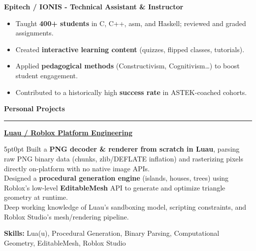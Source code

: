 \documentclass[9pt]{extarticle}
\begin{document}
{\bfseries Epitech / IONIS - Technical Assistant \& Instructor}
\begin{itemize}[noitemsep, topsep=0pt]
	\item Taught {\bfseries 400+ students} in C, C++, asm, and Haskell; reviewed and graded assignments.
	\item Created {\bfseries interactive learning content} (quizzes, flipped classes, tutorials).
	\item Applied {\bfseries pedagogical methods} (Constructivism, Cognitivism…) to boost student engagement.
	\item Contributed to a historically high {\bfseries success rate} in ASTEK-coached cohorts.
\end{itemize}

\par\vspace{1pt}


{\large\bfseries Personal Projects}
\par\vspace{-8pt}
\rule{\linewidth}{0.4pt}
\par\vspace{1pt}

\underline{{\bfseries Luau / Roblox Platform Engineering}}
\par
\begin{adjustwidth}{5pt}{0pt}
	Built a {\bfseries PNG decoder \& renderer from scratch in Luau}, parsing raw PNG binary data (chunks, zlib/DEFLATE inflation) and rasterizing pixels directly on-platform with no native image APIs. \\
	Designed a {\bfseries procedural generation engine} (islands, houses, trees) using Roblox's low-level {\bfseries EditableMesh} API to generate and optimize triangle geometry at runtime. \\
	Deep working knowledge of Luau's sandboxing model, scripting constraints, and Roblox Studio's mesh/rendering pipeline.
\end{adjustwidth}
\par
{\bfseries Skills:} Lua(u), Procedural Generation, Binary Parsing, Computational Geometry, EditableMesh, Roblox Studio

\par\vspace{1pt}
\end{document}
